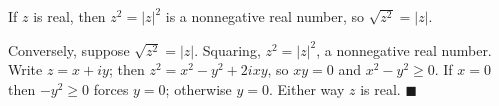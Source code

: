 If $z$ is real, then $z^2=|z|^2$ is a nonnegative real number, so $\sqrt{z^2}=|z|$.

Conversely, suppose $\sqrt{z^2}=|z|$. Squaring, $z^2=|z|^2$, a nonnegative real number. Write $z=x+iy$; then $z^2=x^2-y^2+2ixy$, so $xy=0$ and $x^2-y^2\ge0$. If $x=0$ then $-y^2\ge0$ forces $y=0$; otherwise $y=0$. Either way $z$ is real. $\blacksquare$
